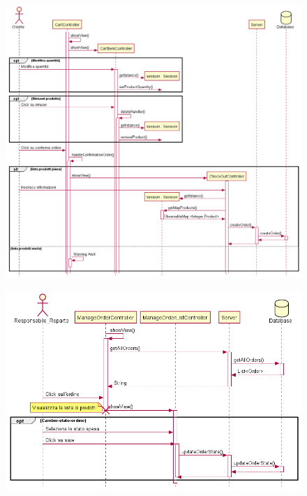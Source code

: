 \documentclass[12pt, a4paper]{article}
\begin{document}
\begin{figure}[H]
\centering
\includegraphics[width=\linewidth]{sequence_conferma_spesa.png}

\end{figure}

\begin{figure}[H]
\centering
\includegraphics[width=\linewidth]{sequence_controllo_spese.png}

\end{figure}
\end{document}

